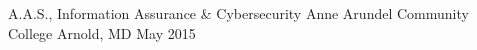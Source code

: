 

\begin{cventries}

  \cventry
    {A.A.S., Information Assurance \& Cybersecurity} %
    {Anne Arundel Community College} %
    {Arnold, MD} %
    {May 2015} %
    {
      \begin{cvitems} %
      \end{cvitems}
    }

\end{cventries}
